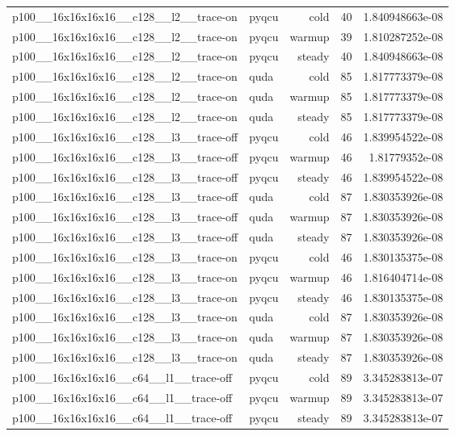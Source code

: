 \begin{table}[htbp]
\begin{tabular}{@{}llrrr@{}}
p100\_\_16x16x16x16\_\_c128\_\_l2\_\_trace-on & pyqcu & cold & 40 & 1.840948663e-08 \\
p100\_\_16x16x16x16\_\_c128\_\_l2\_\_trace-on & pyqcu & warmup & 39 & 1.810287252e-08 \\
p100\_\_16x16x16x16\_\_c128\_\_l2\_\_trace-on & pyqcu & steady & 40 & 1.840948663e-08 \\
p100\_\_16x16x16x16\_\_c128\_\_l2\_\_trace-on & quda & cold & 85 & 1.817773379e-08 \\
p100\_\_16x16x16x16\_\_c128\_\_l2\_\_trace-on & quda & warmup & 85 & 1.817773379e-08 \\
p100\_\_16x16x16x16\_\_c128\_\_l2\_\_trace-on & quda & steady & 85 & 1.817773379e-08 \\
p100\_\_16x16x16x16\_\_c128\_\_l3\_\_trace-off & pyqcu & cold & 46 & 1.839954522e-08 \\
p100\_\_16x16x16x16\_\_c128\_\_l3\_\_trace-off & pyqcu & warmup & 46 & 1.81779352e-08 \\
p100\_\_16x16x16x16\_\_c128\_\_l3\_\_trace-off & pyqcu & steady & 46 & 1.839954522e-08 \\
p100\_\_16x16x16x16\_\_c128\_\_l3\_\_trace-off & quda & cold & 87 & 1.830353926e-08 \\
p100\_\_16x16x16x16\_\_c128\_\_l3\_\_trace-off & quda & warmup & 87 & 1.830353926e-08 \\
p100\_\_16x16x16x16\_\_c128\_\_l3\_\_trace-off & quda & steady & 87 & 1.830353926e-08 \\
p100\_\_16x16x16x16\_\_c128\_\_l3\_\_trace-on & pyqcu & cold & 46 & 1.830135375e-08 \\
p100\_\_16x16x16x16\_\_c128\_\_l3\_\_trace-on & pyqcu & warmup & 46 & 1.816404714e-08 \\
p100\_\_16x16x16x16\_\_c128\_\_l3\_\_trace-on & pyqcu & steady & 46 & 1.830135375e-08 \\
p100\_\_16x16x16x16\_\_c128\_\_l3\_\_trace-on & quda & cold & 87 & 1.830353926e-08 \\
p100\_\_16x16x16x16\_\_c128\_\_l3\_\_trace-on & quda & warmup & 87 & 1.830353926e-08 \\
p100\_\_16x16x16x16\_\_c128\_\_l3\_\_trace-on & quda & steady & 87 & 1.830353926e-08 \\
p100\_\_16x16x16x16\_\_c64\_\_l1\_\_trace-off & pyqcu & cold & 89 & 3.345283813e-07 \\
p100\_\_16x16x16x16\_\_c64\_\_l1\_\_trace-off & pyqcu & warmup & 89 & 3.345283813e-07 \\
p100\_\_16x16x16x16\_\_c64\_\_l1\_\_trace-off & pyqcu & steady & 89 & 3.345283813e-07 \\

\end{tabular}
\end{table}
